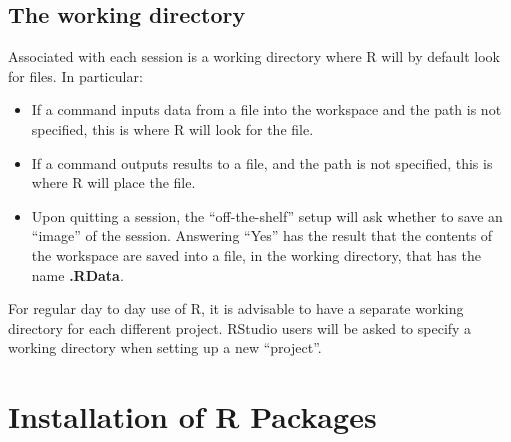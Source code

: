 \subsection{The working directory}\label{ss:workdir}

Associated with each session 
is a working directory where R will by default look
for files.  In particular:
\begin{itemize}
\item If a command inputs data from a file into the
workspace and the path is not specified, this is where R
will look for the file.
\item If a command outputs results to a file, and the path is not specified,
this is where R will place the file.
\item Upon quitting a session, the ``off-the-shelf'' setup will ask
  whether to save an ``image'' of the session. 
  Answering
  ``Yes'' has the result that the contents of the workspace are saved
  into a file, in the working directory, that has the name {\bf
    .RData}.  
\end{itemize}

For regular day to day use of R,
it is advisable to have a separate working
directory for each different project.
RStudio users will be asked to specify
a working directory when setting up a new ``project''.

\section{Installation of R Packages}\label{sec:pkgs}

\noindent
{}
\vspace*{6pt}

